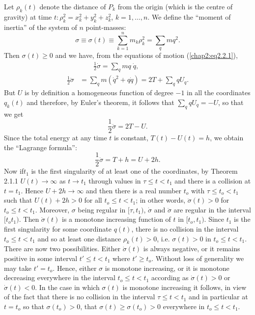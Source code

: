 Let $\rho_k(t)$ denote the distance of $P_k$ from the origin (which is the centre of gravity) at time $t : \rho^2_k = x^2_k + y^2_k + z^2_k$, $k=1, \ldots, n$. We define the ``moment of inertia'' of the system of $n$ point-masses:
\begin{equation*}
\sigma \equiv \sigma(t) \equiv \sum\limits^n_{k=1} m_k \rho^2_k = \sum_q mq^2. 
\tag{2.2.2}\label{chap2:eq2.2.2} 
\end{equation*}
Then $\sigma (t) \geq 0$ and we have, from the equations of motion (\ref{chap2:eq2.2.1}),
\begin{align*}
& \qquad \frac{1}{2} \dot{\sigma}  = \sum_q mq \; \dot{q},\\
\frac{1}{2} \ddot{\sigma} & = \sum_q m(\dot{q}^2 + q \dot{q}) = 2 T + \sum\limits_q q U_q. \tag{2.2.3}\label{chap2:eq2.2.3} 
\end{align*}
But $U$ is by definition a homogeneous function of degree $-1$ in all the coordinates $q_k(t)$ and therefore, by Euler's theorem, it follows that $\sum\limits_q qU_q = -U$, so that we get
$$
\frac{1}{2} \ddot{\sigma} = 2 T - U. 
$$
Since the total energy at any time $t$ is constant, $T(t) - U(t) = h$, we obtain the ``Lagrange formula'':
\begin{equation*}
\frac{1}{2} \ddot{\sigma} = T + h = U + 2h. \tag{2.2.4}\label{chap2:eq2.2.4} 
\end{equation*}
Now if\pageoriginale $t_1$ is the first singularity of at least one of the coordinates, by Theorem 2.1.1 $U(t) \to \infty$ as $t \to t_1$ through values in $\tau \leq t < t_1$ and there is a collision at $t=t_1$. Hence $U + 2h \to \infty$ and then there is a real number $t_o$ with $\tau \leq t_o < t_1$ such that $U(t) + 2h > 0$ for all $t_o\leq t < t_1$; in other words, $\ddot{\sigma}(t) >0$ for $t_o \leq t < t_1$. Moreover, $\sigma$ being regular in $[\tau, t_1)$, $\dot{\sigma}$ and $\ddot{\sigma}$ are regular in the interval $[t_o t_1)$. Then $\dot{\sigma}(t)$ is a monotone increasing function of $t$ in $[t_o, t_1)$. Since $t_1$ is the first singularity for some coordinate $q(t)$, there is no collision in the interval $t_o \leq t < t_1$ and so at least one distance $\rho_k(t) >0$, i.e. $\sigma (t)>0$ in $t_o \leq t < t_1$. There are now two possibilities. Either $\dot{\sigma}(t)$ is always negative, or it remains positive in some interval $t' \leq t < t_1$ where $t'\geq t_o$. Without loss of generality we may take $t'=t_o$. Hence, either $\sigma$ is monotone increasing, or it is monotone decreasing everywhere in the interval $t_o \leq t < t_1$ according as $\dot{\sigma} (t) >0$ or $\dot{\sigma} (t)<0$. In the case in which $\sigma(t)$ is monotone increasing it follows, in view of the fact that there is no collision in the interval $\tau \leq t < t_1$ and in particular at $t = t_o$ so that $\sigma (t_o) > 0$, that $\sigma (t) \geq \sigma (t_o) > 0$ everywhere in $t_o \leq t < t_1$.

